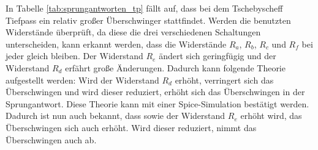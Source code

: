 \noindent In Tabelle \ref{tab:sprungantworten_tp} fällt auf, dass bei dem Tschebyscheff Tiefpass ein relativ großer Überschwinger stattfindet. Werden die benutzten Widerstände überprüft, da diese die drei verschiedenen Schaltungen unterscheiden, kann erkannt werden, dass die Widerstände $R_a$, $R_b$, $R_c$ und $R_f$ bei jeder gleich bleiben. Der Widerstand $R_e$ ändert sich geringfügig und der Widerstand $R_d$ erfährt große Änderungen. Dadurch kann folgende Theorie aufgestellt werden: Wird der Widerstand $R_d$ erhöht, verringert sich das Überschwingen und wird dieser reduziert, erhöht sich das Überschwingen in der Sprungantwort. Diese Theorie kann mit einer Spice-Simulation bestätigt werden. Dadurch ist nun auch bekannt, dass sowie der Widerstand $R_e$ erhöht wird, das Überschwingen sich auch erhöht. Wird dieser reduziert, nimmt das Überschwingen auch ab.







